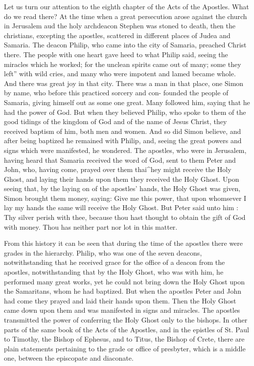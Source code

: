 Let us turn our attention to the eighth chapter
of the Acts of the Apostles. What do we 
read there? At the time when a great persecution
arose against the church in Jerusalem aud 
the holy archdeacon Stephen was stoned to 
death, then the christians, excepting the 
apostles, scattered in different places of Judea 
and Samaria. The deacon Philip, who came 
into the city of Samaria, preached Christ there. 
The people with one heart gave heed to what 
Philip said, seeing the miracles which he 
worked; for the unclean spirits came out of 
many; some they left'' with wild cries, and many 
who were impotent and lamed became whole. 
And there was great joy in that city. There 
was a man in that place, one Simon by name, 
who before this practiced sorcery and con- 
founded the people of Samaria, giving himself 
out as some one great. Many followed him, 
saying that he had the power of God. But 
when they believed Philip, who spoke to them 
of the good tidings of the kingdom of God and 
of the name of Jesus Christ, they received baptism
of him, both men and women. And so did 
Simon believe, and after being baptized he remained
with Philip, and, seeing the great 
powers and signs which were manifested, he 
wondered. The apostles, who were in Jerusalem,
having heard that Samaria received the 
word of God, sent to them Peter and John, who, 
having come, prayed over them thai^hey might 
receive the Holy Ghost, and laying their hands 
upon them they received the Holy Ghost. 
Upon seeing that, by the laying on of the 
apostles' hands, the Holy Ghost was given,
Simon brought them money, saying: Give me 
this power, that upon whomsever I lay my 
hands the same will receive the Holy Ghost. 
But Peter said unto him : Thy silver perish 
with thee, because thou hast thought to obtain 
the gift of God with money. Thou has neither 
part nor lot in this matter. 

From this history it can be seen that during the 
time of the apostles there were grades in the 
hierarchy. Philip, who was one of the seven deacons,
notwithstanding that he received grace 
for the office of a deacon from the apostles,
notwithstanding that by the Holy Ghost, who was 
with him, he performed many great works, yet 
he could not bring down the Holy Ghost upon 
the Samaritans, whom he had baptized. But 
when the apostles Peter and John had come 
they prayed and laid their hands upon them. 
Then the Holy Ghost came down upon them 
and was manifested in signs and miracles. The 
apostles transmitted the power of conferring 
the Holy Ghost only to the bishops. In other 
parts of the same book of the Acts of the Apostles,
and in the epistles of St. Paul to Timothy, 
the Bishop of Ephesus, and to Titus, the Bishop 
of Crete, there are plain statements pertaining 
to the grade or office of presbyter, which is a
middle one, between the episcopate and diaconate. 

